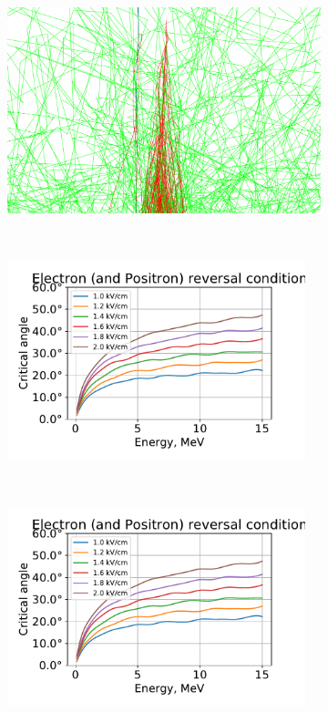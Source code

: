 \documentclass{webofc}
\begin{document}
\begin{figure}[ht!]
	\begin{subfigure}[b]{0.5\textwidth}
    	\includegraphics[width=0.95\linewidth]{pictures/10_dwyer}
        \caption{}
        \label{pic-dwyer-a}
    \end{subfigure}
	~
    \begin{subfigure}
        \begin{subfigure}[b]{0.22\textwidth}
		\includegraphics[width=0.95\textwidth]{pictures/09_condition}
        \caption{}
        \label{pic-reverse-b}
    \end{subfigure}
    ~
      \begin{subfigure}[b]{0.22\textwidth}
		\includegraphics[width=0.95\textwidth]{pictures/09_condition}
        \caption{}
        \label{pic-reverse-b}
    \end{subfigure}
    \end{subfigure}


\end{figure}
\end{document}
